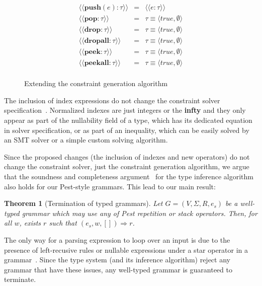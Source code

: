 \documentclass[preprint,12pt]{elsarticle}
\newtheorem{Theorem}{Theorem}
\theoremstyle{definition}
\begin{document}
\begin{figure}[H]
  \[
    \begin{array}{lcl}
      \langle\langle \mathbf{push}(e) : \tau\rangle\rangle & = & \langle\langle e : \tau \rangle\rangle \\
      \langle\langle \mathbf{pop} : \tau \rangle\rangle & = & \tau \equiv \langle true, \emptyset \rangle\\
      \langle\langle \mathbf{drop} : \tau \rangle\rangle & = & \tau \equiv \langle true, \emptyset \rangle\\
      \langle\langle \mathbf{dropall} : \tau \rangle\rangle & = & \tau \equiv \langle true, \emptyset \rangle\\
      \langle\langle \mathbf{peek} : \tau \rangle\rangle & = & \tau \equiv \langle true, \emptyset \rangle\\
      \langle\langle \mathbf{peekall} : \tau \rangle\rangle & = & \tau \equiv \langle true, \emptyset \rangle\\
    \end{array}
  \]
  \caption{Extending the constraint generation algorithm}
  \label{fig:constraint-gen}
\end{figure}

The inclusion of index expressions do not change the constraint solver specification~\cite{Cardoso23}.
Normalized indexes are just integers or the \textbf{infty} and they only appear as part of the
nullability field of a type, which has its dedicated equation in solver specification, or as part
of an inequality, which can be easily solved by an SMT solver or a simple custom solving algorithm.

Since the proposed changes (the inclusion of indexes and new operators) do not change the
constraint solver, just the constraint generation algorithm, we argue that the
soundness and completeness argument~\cite{Cardoso23} for the type inference algorithm
also holds for our Pest-style grammars. This lead to our main result:

\begin{Theorem}[Termination of typed grammars]
  Let $G = (V,\Sigma,R, e_s)$ be a well-typed grammar which may use any of Pest
  repetition or stack operators. Then, for all $w$, exists $r$
  such that $(e_s,w,[])\Rightarrow r$.
\end{Theorem}

The only way for a parsing expression to loop over an input is due to
the presence of left-recusive rules or nullable expressions
under a star operator in a grammar~\cite{Ford2004}. Since the type system (and its
inference algorithm) reject any grammar that have these issues,
any well-typed grammar is guaranteed to terminate.
\end{document}

